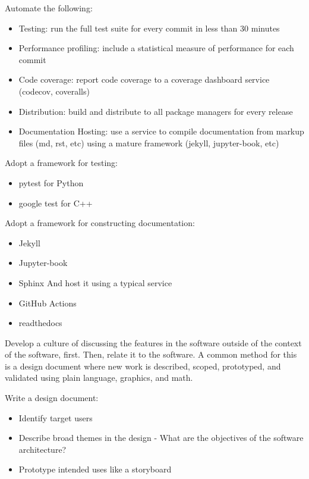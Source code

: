 \documentclass[]{nrel}
\begin{document}
Automate the following:
\begin{itemize}
\item Testing: run the full test suite for every commit in less than 30 minutes

\item Performance profiling: include a statistical measure of performance for each commit

\item Code coverage: report code coverage to a coverage dashboard service (codecov, coveralls)

\item Distribution: build and distribute to all package managers for every release

\item Documentation Hosting: use a service to compile documentation from markup files (md, rst, etc)
using a mature framework (jekyll, jupyter-book, etc)

\end{itemize}

Adopt a framework for testing:
\begin{itemize}
\item pytest for Python

\item google test for C++

\end{itemize}

Adopt a framework for constructing documentation:
\begin{itemize}
\item Jekyll

\item Jupyter-book

\item Sphinx
And host it using a typical service

\item GitHub Actions

\item readthedocs

\end{itemize}

Develop a culture of discussing the features in the software outside of the context of the software, first.
Then, relate it to the software.
A common method for this is a design document where new work is described, scoped, prototyped,
and validated using plain language, graphics, and math.

Write a design document:
\begin{itemize}
\item Identify target users

\item Describe broad themes in the design - What are the objectives of the software architecture?

\item Prototype intended uses like a storyboard

\end{itemize}
\end{document}
